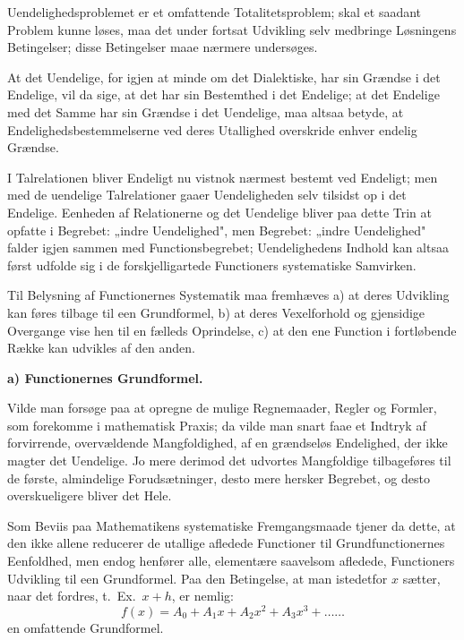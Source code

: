 \documentclass[12pt]{book}
\newcommand{\opage}[1]{\marginnote{\footnotesize\textit{[#1]}}}
\begin{document}
Uendelighedsproblemet er et omfattende Totalitetsproblem; skal et saadant Problem
kunne løses, maa det under fortsat Udvikling selv medbringe Løsningens
Betingelser; disse Betingelser maae nærmere undersøges.

At det Uendelige, for igjen at minde om det Dialektiske, har sin Grændse i det
Endelige, vil da sige, at det har sin Bestemthed i det Endelige; at det Endelige
med det Samme har sin Grændse i det Uendelige, maa altsaa betyde, at
Endelighedsbestemmelserne ved deres Utallighed overskride enhver endelig
Grændse.

I Talrelationen bliver Endeligt nu vistnok nærmest bestemt ved Endeligt; men med
de uendelige Talrelationer gaaer Uendeligheden selv tilsidst op i det Endelige.
Eenheden af Relationerne og det Uendelige bliver paa dette Trin at opfatte i
Begrebet: „indre Uendelighed", men Begrebet: „indre Uendelighed" falder igjen
sammen med Functionsbegrebet; Uendelighedens Indhold kan altsaa først udfolde sig
i de forskjelligartede Functioners systematiske Samvirken.

\opage{32} Til Belysning af Functionernes Systematik maa fremhæves a) at deres Udvikling
kan føres tilbage til een Grundformel, b) at deres Vexelforhold og gjensidige
Overgange vise hen til en fælleds Oprindelse, c) at den ene Function i
fortløbende Række kan udvikles af den anden.

\begin{center}
\textbf{a) Functionernes Grundformel.}
\end{center}
{}

Vilde man forsøge paa at opregne de mulige Regnemaader, Regler og Formler, som
forekomme i mathematisk Praxis; da vilde man snart faae et Indtryk af
forvirrende, overvældende Mangfoldighed, af en grændseløs Endelighed, der ikke
magter det Uendelige. Jo mere derimod det udvortes Mangfoldige tilbageføres til
de første, almindelige Forudsætninger, desto mere hersker Begrebet, og desto
overskueligere bliver det Hele.

Som Beviis paa Mathematikens systematiske Fremgangsmaade tjener da dette, at den
ikke allene reducerer de utallige afledede Functioner til Grundfunctionernes
Eenfoldhed, men endog henfører alle, elementære saavelsom afledede, Functioners
Udvikling til een Grundformel. Paa den Betingelse, at man istedetfor $x$ sætter,
naar det fordres, t.\ Ex.\ $x+h$, er nemlig:
\[
f(x) = A_0 + A_1 x + A_2 x^{2} + A_3 x^{3} + \dots\dots
\]
en omfattende Grundformel.
\end{document}

